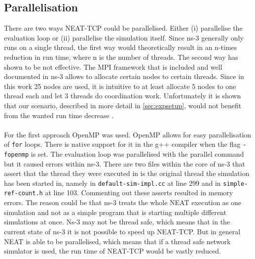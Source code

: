\subsection{Parallelisation}\label{subsec:parallelisation}
There are two ways NEAT-TCP could be parallelised. Either (i) parallelise the evaluation loop or (ii) parallelise the simulation itself. Since ns-3 generally only runs on a single thread, the first way would theoretically result in an n-times reduction in run time, where n is the number of threads.  The second way has shown to be not effective. The MPI framework that is included and well documented in ns-3 allows to allocate certain nodes to certain threads. Since in this work 25 nodes are used, it is intuitive to at least allocate 5 nodes to one thread each and let 3 threads do coordination work. Unfortunately it is shown that our scenario, described in more detail in \autoref{sec:expsetup}, would not benefit from the wanted run time decrease \cite{distributedns3}. \\\\
For the first approach OpenMP \cite{openmp} was used. OpenMP allows for easy parallelisation of \texttt{for} loops. There is native support for it in the g++ compiler when the flag \texttt{-fopenmp} is set. The evaluation loop was parallelised with the parallel command but it caused errors within ns-3. There are two files within the core of ns-3 that assert that the thread they were executed in is the original thread the simulation has been started in, namely in \texttt{default-sim-impl.cc} at line 299 and in \texttt{simple-ref-count.h} at line 103. Commenting out these asserts resulted in memory errors. The reason could be that ns-3 treats the whole NEAT execution as one simulation and not as a simple program that is starting multiple different simulations at once. Ns-3 may not be thread safe, which means that in the current state of ns-3 it is not possible to speed up NEAT-TCP. But in general NEAT is able to be parallelised, which means that if a thread safe network simulator is used, the run time of NEAT-TCP would be vastly reduced.

